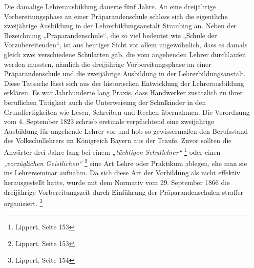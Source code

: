 \documentclass[a4paper]{article}
\newcommand\textstyleZitate[1]{\textit{#1}}
\begin{document}
Die damalige Lehrerausbildung dauerte fünf Jahre. An eine dreijährige
Vorbereitungsphase an einer Präparandenschule schloss sich die
eigentliche zweijährige Ausbildung in der Lehrerbildungsanstalt
Straubing an. Neben der Bezeichnung „Präparandenschule“, die so viel
bedeutet wie „Schule der Vorzubereitenden“, ist aus heutiger Sicht vor
allem ungewöhnlich, dass es damals gleich zwei verschiedene Schularten
gab, die vom angehenden Lehrer durchlaufen werden mussten, nämlich die
dreijährige Vorbereitungsphase an einer Präparandenschule und die
zweijährige Ausbildung in der Lehrerbildungsanstalt. Diese Tatsache
lässt sich aus der historischen Entwicklung der Lehrerausbildung
erklären. Es war Jahrhunderte lang Praxis, dass Handwerker zusätzlich
zu ihrer beruflichen Tätigkeit auch die Unterweisung der Schulkinder in
den Grundfertigkeiten wie Lesen, Schreiben und Rechen übernahmen. Die
Verordnung vom 4. September 1823 schrieb erstmals verpflichtend eine
zweijährige Ausbildung für angehende Lehrer vor und hob so
gewissermaßen den Berufsstand des Volkschullehrers im Königreich Bayern
aus der Traufe. Zuvor sollten die Anwärter drei Jahre lang bei einem
\textstyleZitate{„tüchtigen Schullehrer“ } \footnote{Lippert, Seite
153} oder einen \textstyleZitate{„vorzüglichen Geistlichen“ }\footnote{
Lippert, Seite 153} eine Art Lehre oder Praktikum ablegen, ehe man sie
ins Lehrerseminar aufnahm. Da sich diese Art der Vorbildung als nicht
effektiv herausgestellt hatte, wurde mit dem Normativ vom 29. September
1866 die dreijährige Vorbereitungszeit durch Einführung der
Präparandenschulen straffer organisiert. \footnote{Lippert, Seite 154}
\end{document}
